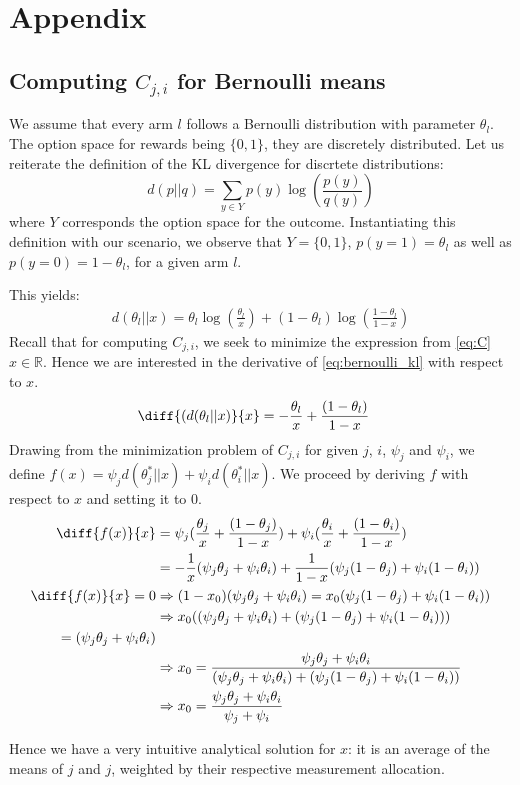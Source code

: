 \chapter{Appendix}

\section{Computing $C_{j, i}$ for Bernoulli means}\label{section:bernoulli_c}

We assume that every arm $l$ follows a Bernoulli distribution with parameter $\theta_l$. The option space for rewards being $\{0, 1\}$, they are discretely distributed. Let us reiterate the definition of the KL divergence for discrtete distributions:
\[d(p || q) = \sum_{y \in Y}p(y) \log(\frac{p(y)}{q(y)})\]
where $Y$ corresponds the option space for the outcome.
Instantiating this definition with our scenario, we observe that $Y=\{0, 1\}$, $p(y=1)=\theta_l$  as well as $p(y=0)=1-\theta_l$, for a given arm $l$.

This yields:
\begin{align}
  d(\theta_l||x) = \theta_l \log(\frac{\theta_l}{x}) + (1-\theta_l) \log(\frac{1-\theta_l}{1-x}) \label{eq:bernoulli_kl}
\end{align}
Recall that for computing $C_{j, i}$, we seek to minimize the expression from \eqref{eq:C} $x \in \mathbb{R}$. Hence we are interested in the derivative of \eqref{eq:bernoulli_kl} with respect to $x$.
\begin{align}
  \diff{(d(\theta_l||x)}{x} &= - \frac{\theta_l}{x} + \frac{(1-\theta_l)}{1-x}
\end{align}
Drawing from the minimization problem of $C_{j,i}$ for given $j$, $i$, $\psi_j$ and $\psi_i$, we define $f(x) = \psi_j d(\theta^*_{j} || x) + \psi_i d(\theta_{i}^* ||x)$. We proceed by deriving $f$ with respect to $x$ and setting it to 0.
\begin{align}
  \diff{f(x)}{x} &= \psi_j(\frac{\theta_j}{x} + \frac{(1-\theta_j)}{1-x}) + \psi_i( \frac{\theta_i}{x} + \frac{(1-\theta_i)}{1-x}) \\
  &= -\frac{1}{x}(\psi_j\theta_j + \psi_i\theta_i) + \frac{1}{1-x}(\psi_j(1 - \theta_j) + \psi_i(1 - \theta_i)) \\
  \diff{f(x)}{x} = 0 &\Rightarrow (1-x_0)(\psi_j\theta_j + \psi_i\theta_i) = x_0(\psi_j(1 - \theta_j) + \psi_i(1 - \theta_i))\\
  &\Rightarrow x_0((\psi_j\theta_j + \psi_i\theta_i) + (\psi_j(1 - \theta_j) + \psi_i(1 - \theta_i)))\\
  = (\psi_j\theta_j + \psi_i\theta_i)\\
  &\Rightarrow x_0 = \frac{\psi_j\theta_j + \psi_i\theta_i}{(\psi_j\theta_j + \psi_i\theta_i) + (\psi_j(1 - \theta_j) + \psi_i(1 - \theta_i))} \\
  &\Rightarrow x_0 = \frac{\psi_j\theta_j + \psi_i\theta_i}{\psi_j + \psi_i}
\end{align}

Hence we have a very intuitive analytical solution for $x$: it is an average of the means of $j$ and $j$, weighted by their respective measurement allocation.
